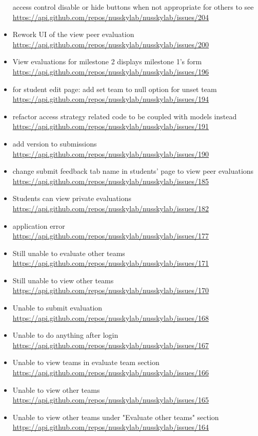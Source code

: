 {\begin{itemize}[noitemsep]
    \item [access control] disable or hide buttons when not appropriate for others to see  \url{https://api.github.com/repos/nusskylab/nusskylab/issues/204} 
    \item Rework UI of the view peer evaluation \url{https://api.github.com/repos/nusskylab/nusskylab/issues/200} 
    \item View evaluations for milestone 2 displays milestone 1's form \url{https://api.github.com/repos/nusskylab/nusskylab/issues/196} 
    \item for student edit page: add set team to null option for unset team \url{https://api.github.com/repos/nusskylab/nusskylab/issues/194} 
    \item refactor access strategy related code to be coupled with models instead \url{https://api.github.com/repos/nusskylab/nusskylab/issues/191} 
    \item add version to submissions \url{https://api.github.com/repos/nusskylab/nusskylab/issues/190} 
    \item change submit feedback tab name in students' page to view peer evaluations \url{https://api.github.com/repos/nusskylab/nusskylab/issues/185} 
    \item Students can view private evaluations \url{https://api.github.com/repos/nusskylab/nusskylab/issues/182} 
    \item application error \url{https://api.github.com/repos/nusskylab/nusskylab/issues/177} 
    \item Still unable to evaluate other teams \url{https://api.github.com/repos/nusskylab/nusskylab/issues/171} 
    \item Still unable to view other teams \url{https://api.github.com/repos/nusskylab/nusskylab/issues/170} 
    \item Unable to submit evaluation \url{https://api.github.com/repos/nusskylab/nusskylab/issues/168} 
    \item Unable to do anything after login \url{https://api.github.com/repos/nusskylab/nusskylab/issues/167} 
    \item Unable to view teams in evaluate team section \url{https://api.github.com/repos/nusskylab/nusskylab/issues/166} 
    \item Unable to view other teams \url{https://api.github.com/repos/nusskylab/nusskylab/issues/165} 
    \item Unable to view other teams under "Evaluate other teams" section \url{https://api.github.com/repos/nusskylab/nusskylab/issues/164} 

\end{itemize}}
